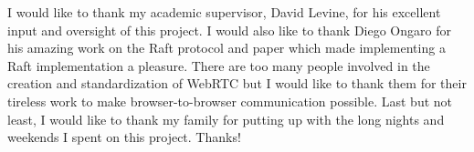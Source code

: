 \documentclass{acmtog} %
\begin{document}
\begin{acks}
I would like to thank my academic supervisor, David Levine, for his
excellent input and oversight of this project. I would also like to
thank Diego Ongaro for his amazing work on the Raft protocol and paper
which made implementing a Raft implementation a pleasure. There are
too many people involved in the creation and standardization of WebRTC
but I would like to thank them for their tireless work to make
browser-to-browser communication possible. Last but not least, I would
like to thank my family for putting up with the long nights and
weekends I spent on this project. Thanks!
\end{acks}





\end{document}
